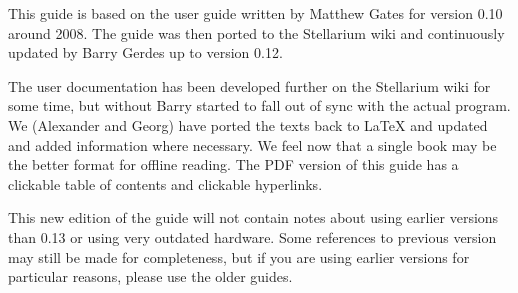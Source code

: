 This guide is based on the user guide written by Matthew Gates for
version 0.10 around 2008. The guide was then ported to the Stellarium
wiki and continuously updated by Barry Gerdes up to version 0.12. 

The user documentation has been developed further on the Stellarium
wiki for some time, but without Barry started to fall out of sync with
the actual program.  We (Alexander and Georg) have ported the texts
back to \LaTeX{} and updated and added information where necessary. We
feel now that a single book may be the better format for offline
reading. The PDF version of this guide has a clickable table of
contents and clickable hyperlinks.

This new edition of the guide will not contain notes about using
earlier versions than 0.13 or using very outdated hardware. Some
references to previous version may still be made for completeness, 
but if you are using earlier versions
for particular reasons, please use the older guides.

